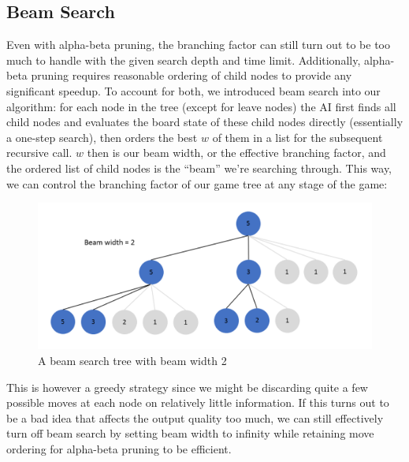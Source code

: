 \documentclass[a4paper,12pt]{article}
\begin{document}
\subsection{Beam Search}
Even with alpha-beta pruning, the branching factor can still turn out to be too much to handle with the given search depth and time limit. Additionally, alpha-beta pruning requires reasonable ordering of child nodes to provide any significant speedup. To account for both, we introduced beam search into our algorithm: for each node in the tree (except for leave nodes) the AI first finds all child nodes and evaluates the board state of these child nodes directly (essentially a one-step search), then orders the best $w$ of them in a list for the subsequent recursive call. $w$ then is our beam width, or the effective branching factor, and the ordered list of child nodes is the ``beam'' we're searching through. This way, we can control the branching factor of our game tree at any stage of the game:

\begin{figure}[H]
    \centering
    \includegraphics[width=\textwidth,keepaspectratio]{pictures/assignment3/BeamSearch.png}
    \caption{A beam search tree with beam width 2}
\end{figure}

This is however a greedy strategy since we might be discarding quite a few possible moves at each node on relatively little information. If this turns out to be a bad idea that affects the output quality too much, we can still effectively turn off beam search by setting beam width to infinity while retaining move ordering for alpha-beta pruning to be efficient.
\end{document}
